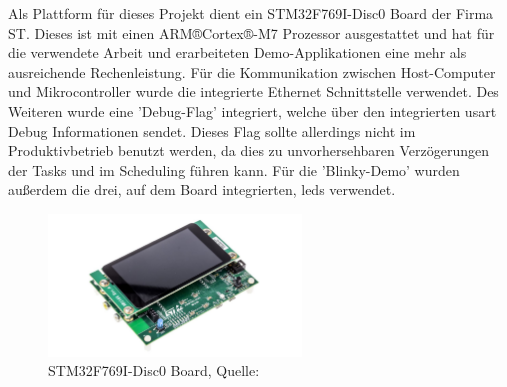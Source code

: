 \documentclass[../EDF Master Thesis.tex]{subfiles}
\begin{document}
Als Plattform für dieses Projekt dient ein STM32F769I-Disc0 Board der Firma ST.
Dieses ist mit einen ARM®Cortex®-M7 Prozessor ausgestattet und hat für die verwendete Arbeit und erarbeiteten Demo-Applikationen eine mehr als ausreichende Rechenleistung.
Für die Kommunikation zwischen Host-Computer und Mikrocontroller wurde die integrierte Ethernet Schnittstelle verwendet.
Des Weiteren wurde eine 'Debug-Flag' integriert, welche über den integrierten \ac{usart} Debug Informationen sendet.
Dieses Flag sollte allerdings nicht im Produktivbetrieb benutzt werden, da dies zu unvorhersehbaren Verzögerungen der Tasks und im Scheduling führen kann.
Für die 'Blinky-Demo' wurden außerdem die drei, auf dem Board integrierten, \ac{led}s verwendet.

\begin{figure}[ht!]
    \begin{center}
        \includegraphics[width=0.6\textwidth]{attachments/stm32f769i-disc0.pdf}
    \end{center}
    \caption{STM32F769I-Disc0 Board, Quelle: \autocite{stm:001}}
    \label{fig:STM32F769I-Disc0_board}
\end{figure}
\end{document}
